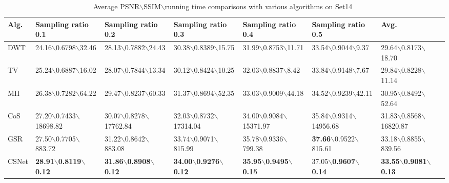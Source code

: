 \documentclass[5pt]{article}
\begin{document}
\begin{table*}[t]\footnotesize
\vspace{-3pt}
\centering
\caption{\small {Average PSNR$\backslash$SSIM$\backslash$running time comparisons with various algorithms on Set14~\cite{rf24}}}\label{tab:tab2}
\begin{tabular}{|l|l|l|l|l|l|l|}
\hline
Alg. & Sampling ratio 0.1 & Sampling ratio 0.2 & Sampling ratio 0.3 & Sampling ratio 0.4 & Sampling ratio 0.5 & Avg.\\
\hline
DWT & 24.16$\backslash$0.6798$\backslash$32.46 & 28.13$\backslash$0.7882$\backslash$24.43 & 30.38$\backslash$0.8389$\backslash$15.75 & 31.99$\backslash$0.8753$\backslash$11.71 & 33.54$\backslash$0.9044$\backslash$9.37 & 29.64$\backslash$0.8173$\backslash$18.70\\
\hline
TV & 25.24$\backslash$0.6887$\backslash$16.02 & 28.07$\backslash$0.7844$\backslash$13.34 & 30.12$\backslash$0.8424$\backslash$10.25 & 32.03$\backslash$0.8837$\backslash$8.42 & 33.84$\backslash$0.9148$\backslash$7.67 & 29.84$\backslash$0.8228$\backslash$11.14\\
\hline
MH & 26.38$\backslash$0.7282$\backslash$64.22 & 29.47$\backslash$0.8237$\backslash$60.33 & 31.37$\backslash$0.8694$\backslash$52.35 & 33.03$\backslash$0.9009$\backslash$44.18 & 34.52$\backslash$0.9239$\backslash$42.11 & 30.95$\backslash$0.8492$\backslash$52.64\\
\hline
CoS & 27.20$\backslash$0.7433$\backslash$\tiny 18698.82 & 30.07$\backslash$0.8278$\backslash$\tiny 17762.84 & 32.03$\backslash$0.8732$\backslash$\tiny 17314.04 & 34.00$\backslash$0.9084$\backslash$\tiny 15371.97 & 35.84$\backslash$0.9314$\backslash$\tiny 14956.68 & 31.83$\backslash$0.8568$\backslash$\tiny 16820.87\\
\hline
GSR & 27.50$\backslash$0.7705$\backslash$883.72 & 31.22$\backslash$0.8642$\backslash$883.08 & 33.74$\backslash$0.9071$\backslash$815.99 & 35.78$\backslash$0.9336$\backslash$799.38 & \textbf{37.66}$\backslash$0.9522$\backslash$815.61 & 33.18$\backslash$0.8855$\backslash$839.56\\
\hline
CSNet & \textbf{28.91}$\backslash$\textbf{0.8119}$\backslash$\textbf{0.12} & \textbf{31.86}$\backslash$\textbf{0.8908}$\backslash$\textbf{0.12} & \textbf{34.00}$\backslash$\textbf{0.9276}$\backslash$\textbf{0.12} & \textbf{35.95}$\backslash$\textbf{0.9495}$\backslash$\textbf{0.15} & 37.05$\backslash$\textbf{0.9607}$\backslash$\textbf{0.14} & \textbf{33.55}$\backslash$\textbf{0.9081}$\backslash$\textbf{0.13}\\\hline
\end{tabular}
\vspace{-15pt}
\end{table*}
\end{document}

